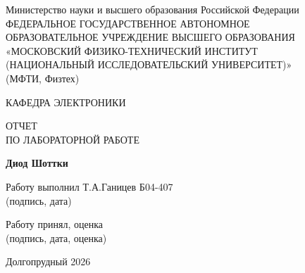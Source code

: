 \documentclass[12pt]{article}
\begin{document}
\begin{center}

\large
Министерство науки и высшего образования Российской Федерации \\
\large
ФЕДЕРАЛЬНОЕ ГОСУДАРСТВЕННОЕ АВТОНОМНОЕ \\
ОБРАЗОВАТЕЛЬНОЕ УЧРЕЖДЕНИЕ ВЫСШЕГО ОБРАЗОВАНИЯ \\
\large
«МОСКОВСКИЙ ФИЗИКО-ТЕХНИЧЕСКИЙ ИНСТИТУТ \\
(НАЦИОНАЛЬНЫЙ ИССЛЕДОВАТЕЛЬСКИЙ УНИВЕРСИТЕТ)» \\
(МФТИ, Физтех)

\vspace{4cm}

\large
КАФЕДРА ЭЛЕКТРОНИКИ

\vspace{0.7cm}

\Large
ОТЧЕТ \\
ПО ЛАБОРАТОРНОЙ РАБОТЕ

\vspace{0.7cm}

\large
\textbf{Диод Шоттки}

\vfill

\noindent
Работу выполнил \hfill \underline{\hspace{6cm}} Т.А.Ганицев Б04-407 \\
\hfill \small{(подпись, дата)}\par

\vspace{3cm}

\noindent
Работу принял, оценка \hfill \underline{\hspace{6cm}} \\
\hfill \small{(подпись, дата, оценка)}

\vfill

Долгопрудный 2026

\end{center}


\thispagestyle{empty}
\end{document}
